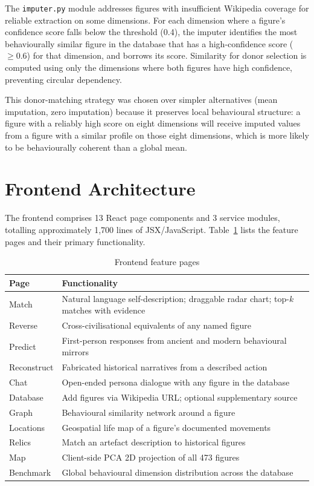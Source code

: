 \documentclass[11pt, a4paper]{report}
\begin{document}
The \texttt{imputer.py} module addresses figures with insufficient Wikipedia coverage for reliable extraction on some dimensions. For each dimension where a figure's confidence score falls below the threshold (0.4), the imputer identifies the most behaviourally similar figure in the database that has a high-confidence score ($\geq 0.6$) for that dimension, and borrows its score. Similarity for donor selection is computed using only the dimensions where both figures have high confidence, preventing circular dependency.

This donor-matching strategy was chosen over simpler alternatives (mean imputation, zero imputation) because it preserves local behavioural structure: a figure with a reliably high score on eight dimensions will receive imputed values from a figure with a similar profile on those eight dimensions, which is more likely to be behaviourally coherent than a global mean.

\section{Frontend Architecture}

The frontend comprises 13 React page components and 3 service modules, totalling approximately 1,700 lines of JSX/JavaScript. Table~\ref{tab:pages} lists the feature pages and their primary functionality.

\begin{table}[H]
  \centering
  \caption{Frontend feature pages}
  \label{tab:pages}
  \begin{tabular}{lp{8.5cm}}
    \toprule
    Page & Functionality \\
    \midrule
    Match & Natural language self-description; draggable radar chart; top-$k$ matches with evidence \\
    Reverse & Cross-civilisational equivalents of any named figure \\
    Predict & First-person responses from ancient and modern behavioural mirrors \\
    Reconstruct & Fabricated historical narratives from a described action \\
    Chat & Open-ended persona dialogue with any figure in the database \\
    Database & Add figures via Wikipedia URL; optional supplementary source \\
    Graph & Behavioural similarity network around a figure \\
    Locations & Geospatial life map of a figure's documented movements \\
    Relics & Match an artefact description to historical figures \\
    Map & Client-side PCA 2D projection of all 473 figures \\
    Benchmark & Global behavioural dimension distribution across the database \\
    \bottomrule
  \end{tabular}
\end{table}
\end{document}

